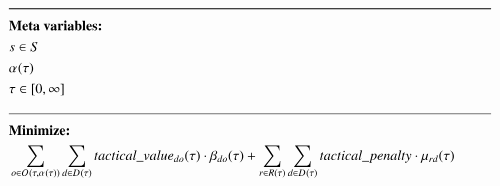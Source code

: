 \begin{alignat}{2}
	& \text{\rule{\linewidth}{0.8pt}} \notag \label{}                                                                                                                                                                                                                                                                                                                                                                     \\ 
	& \textbf{Meta variables:}                                                                                                                                                                                                                                                             \notag\\
	& \ElementScheduler \in \SetScheduler                                                                                                                                                                                                                                                    \\
	& \VarStrategicWorkOrderAssignment{}{}                                                                                                                                                                                                                                                 \\
	& \tau \in [0, \infty]                                                                                                                                                                                                                                                                 \\
	& \text{\rule{\linewidth}{0.4pt}} \notag\\
	& \textbf{Minimize:}                                                                                                                                                                                                                                                                   \notag\\
	& \sum_{\ElementOperation \in \SetOperation{}{\VarStrategicWorkOrderAssignment{}{}}} \sum_{\ElementDays \in \SetDays{}} \ParTacticalValue \cdot \VarTacticalWork{\ElementDays}{\ElementOperation} + \sum_{r \in \SetResource} \sum_{\ElementDays \in \SetDays{}} \ParTacticalPenalty \cdot \VarTacticalExcess                                                                                                                                                                                \\  

\end{alignat}

